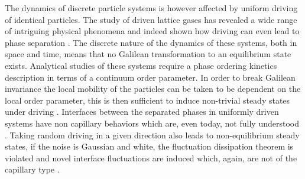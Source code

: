 The dynamics of discrete particle systems is however affected by uniform driving of identical particles. The study of driven lattice gases has revealed a wide range of intriguing physical phenomena and indeed shown how driving can even lead to phase separation \cite{katz1984,zia1991,leun1993,schm1995,schm1998}. The discrete nature of the dynamics of these systems, both in space and time, means that no Galilean transformation to an equilibrium state exists. Analytical studies of these systems require a phase ordering kinetics description in terms of a continuum order parameter. In order to break Galilean invariance the local mobility of the particles can be taken to be dependent on the local order parameter, this is then sufficient to induce non-trivial steady states under driving \cite{katz1984,leun1993,schm1995,schm1998}. Interfaces between the separated phases in uniformly driven systems have non capillary behaviors which are, even today, not fully understood \cite{leun1993}.
Taking random driving in a given direction also leads to non-equilibrium steady states, if the noise is Gaussian and white, the fluctuation dissipation theorem is violated and novel interface fluctuations are induced which, again, are  not of  the capillary type \cite{zia1991}. 
